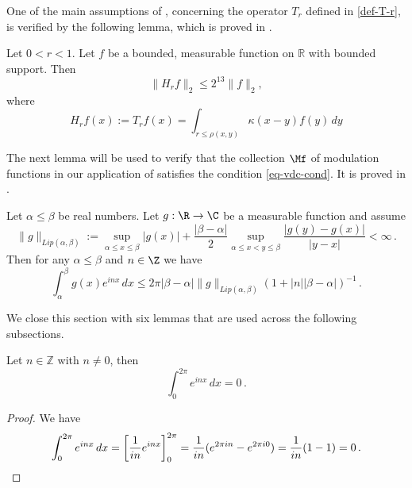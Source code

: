 One of the main assumptions of , concerning the operator $T_r$ defined in \eqref{def-T-r}, is verified by the following lemma, which is proved in .
\begin{lemma}
    \label{Hilbert-strong-2-2}
    \leanok
    Let $0<r<1$. Let $f$ be a bounded, measurable function on $\mathbb{R}$ with bounded support. Then
    \begin{equation}
        \label{eq-Hr-L2-bound}
        \|H_rf\|_{2}\leq 2^{13} \|f\|_2,
    \end{equation}
    where
    \begin{equation}
        \label{def-H-r}
        H_r f(x) := T_r f(x) = \int_{r\le\rho(x,y)} \kappa(x-y) f(y) \, dy
    \end{equation}
\end{lemma}

The next lemma will be used to verify that the collection $\Mf$ of modulation functions in our application of  satisfies the condition \eqref{eq-vdc-cond}.
It is proved in .

\begin{lemma}
\label{van-der-Corput}
\leanok
{}
    Let $\alpha\le\beta$ be real numbers. Let $g:\R\to \C$ be a measurable function and assume
    \begin{equation}
        \|g\|_{Lip(\alpha,\beta)}:=\sup_{\alpha\le x\le \beta}|g(x)|+\frac{|\beta-\alpha|}{2}
        \sup_{\alpha\le x<y\le \beta} \frac {|g(y)-g(x)|}{|y-x|}<\infty\, .
    \end{equation}
    Then for any $\alpha \le \beta$ and $n\in\Z$ we have
    \begin{equation}
        \int _{\alpha}^{\beta} g(x) e^{inx}\, dx\le 2\pi |\beta-\alpha|\|g\|_{Lip(\alpha,\beta)}(1+|n||\beta-\alpha|)^{-1}\, .
    \end{equation}

\end{lemma}


We close this section with six lemmas that are used
across the following subsections.

\begin{lemma}
\label{mean-zero-oscillation}
Let $n\in \mathbb{Z}$ with $n\neq 0$, then
\begin{equation}
\int_0^{2\pi} e^{inx}\, dx=0\,.
\end{equation}
\end{lemma}
\begin{proof}
We have
\begin{equation*}
\int_0^{2\pi} e^{inx}\, dx=\left[ \frac 1{in}e^{inx}\right]_0^{2\pi}=\frac 1{in}(e^{2\pi i n}-e^{2\pi i 0})=\frac 1{in}(1-1)=0\, . \qedhere
\end{equation*}

\end{proof}


